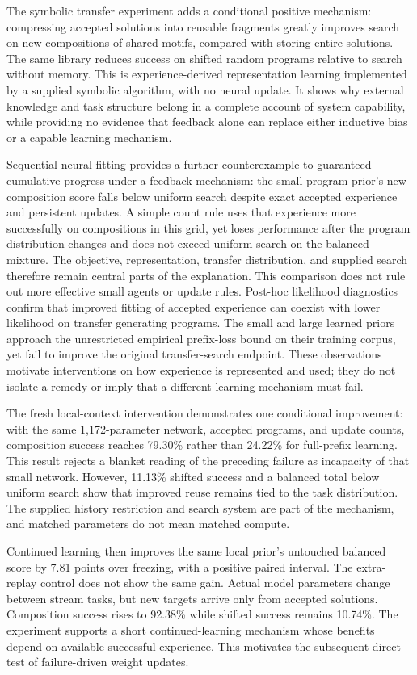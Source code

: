 \documentclass[11pt]{article}
\begin{document}
The symbolic transfer experiment adds a conditional positive mechanism:
compressing accepted solutions into reusable fragments greatly improves search
on new compositions of shared motifs, compared with storing entire solutions.
The same library reduces success on shifted random programs relative to
search without memory. This is experience-derived representation learning
implemented by a supplied symbolic algorithm, with no neural update. It shows
why external knowledge and task structure belong in a complete account of
system capability, while providing no evidence that feedback alone can replace
either inductive bias or a capable learning mechanism.

Sequential neural fitting provides a further counterexample to guaranteed
cumulative progress under a feedback mechanism: the small program prior's
new-composition score falls below uniform search despite exact accepted
experience and persistent updates. A simple count rule uses that experience
more successfully on compositions in this grid, yet loses performance after
the program distribution changes and does not exceed uniform search on the
balanced mixture. The objective, representation, transfer distribution, and
supplied search therefore remain central parts of the explanation. This
comparison does not rule out more effective small agents or update rules.
Post-hoc likelihood diagnostics confirm that improved fitting of accepted
experience can coexist with lower likelihood on transfer generating programs.
The small and large learned priors approach the unrestricted empirical
prefix-loss bound on their training corpus, yet fail to improve the original
transfer-search endpoint. These observations motivate interventions on how
experience is represented and used; they do not isolate a remedy or imply
that a different learning mechanism must fail.

The fresh local-context intervention demonstrates one conditional improvement:
with the same 1,172-parameter network, accepted programs, and update counts,
composition success reaches 79.30\% rather than 24.22\% for full-prefix
learning. This result rejects a blanket reading of the preceding failure as
incapacity of that small network. However, 11.13\% shifted success and a
balanced total below uniform search show that improved reuse remains tied
to the task distribution. The supplied history restriction and search system
are part of the mechanism, and matched parameters do not mean matched compute.

Continued learning then improves the same local prior's untouched balanced
score by 7.81 points over freezing, with a positive paired interval. The
extra-replay control does not show the same gain. Actual model parameters
change between stream tasks, but new targets arrive only from accepted
solutions. Composition success rises to 92.38\% while shifted success remains
10.74\%. The experiment supports a short continued-learning mechanism whose
benefits depend on available successful experience. This motivates the
subsequent direct test of failure-driven weight updates.
\end{document}
